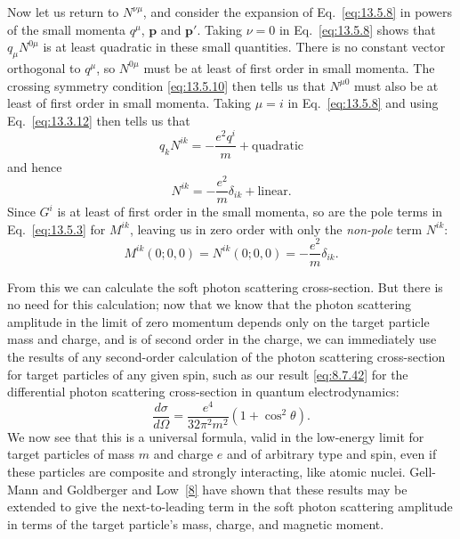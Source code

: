 Now let us return to $N^{\nu\mu}$, and consider the expansion of Eq.~\eqref{eq:13.5.8} in
powers of the small momenta $q^\mu$, $\mathbf p$ and $\mathbf p'$. Taking $\nu=0$ in Eq.~\eqref{eq:13.5.8}
shows that $q_\mu N^{0\mu}$ is at least quadratic in these small quantities. There is
no constant vector orthogonal to $q^\mu$, so $N^{0\mu}$ must be at least of first order
in small momenta. The crossing symmetry condition \eqref{eq:13.5.10} then tells
us that $N^{\mu0}$ must also be at least of first order in small momenta. Taking
$\mu=i$ in Eq.~\eqref{eq:13.5.8} and using Eq.~\eqref{eq:13.3.12} then tells us that
\begin{equation*}
q_kN^{ik}=-\frac{e^2q^i}{m}+\text{quadratic}
\end{equation*}
and hence
\begin{equation}
N^{ik}=-\frac{e^2}{m}\delta_{ik}+\text{linear}.
\tag{13.5.13}\label{eq:13.5.13}
\end{equation}
Since $G^i$ is at least of first order in the small momenta, so are the pole
terms in Eq.~\eqref{eq:13.5.3} for $M^{ik}$, leaving us in zero order with only the \emph{non-pole}
term $N^{ik}$:
\begin{equation}
M^{ik}(0;0,0)=N^{ik}(0;0,0)=-\frac{e^2}{m}\delta_{ik}.
\tag{13.5.14}\label{eq:13.5.14}
\end{equation}

From this we can calculate the soft photon scattering cross-section. But
there is no need for this calculation; now that we know that the photon
scattering amplitude in the limit of zero momentum depends only on the
target particle mass and charge, and is of second order in the charge,
we can immediately use the results of any second-order calculation of the
photon scattering cross-section for target particles of any given spin, such
as our result \eqref{eq:8.7.42} for the differential photon scattering cross-section in
quantum electrodynamics:
\begin{equation}
\frac{d\sigma}{d\Omega}=\frac{e^4}{32\pi^2m^2}(1+\cos^2\theta).
\tag{13.5.15}\label{eq:13.5.15}
\end{equation}
We now see that this is a universal formula, valid in the low-energy limit
for target particles of mass $m$ and charge $e$ and of arbitrary type and
spin, even if these particles are composite and strongly interacting, like
atomic nuclei. Gell-Mann and Goldberger and Low~\hyperref[ref:13.8]{[8]} have shown that
these results may be extended to give the next-to-leading term in the soft
photon scattering amplitude in terms of the target particle's mass, charge,
and magnetic moment.
